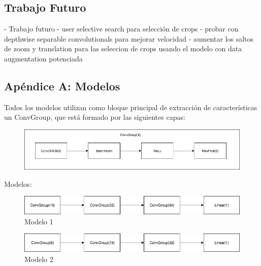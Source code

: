 \documentclass[a4paper, 11pt]{article}
\begin{document}
		\subsection{Trabajo Futuro}
			- Trabajo futuro
				- user selective search para selección de crops
				- probar con depthwise separable convolutionals para mejorar velocidad
				- aumentar los saltos de zoom y translation para las seleccion de crops usando el modelo con data augmentation potenciada
				
	\subsection{Apéndice A: Modelos}
		Todos los modelos utilizan como bloque principal de extracción de características un ConvGroup, que está formado por las siguientes capas:
	
	
	\begin{figure}[htb!]
		\begin{minipage}{1\textwidth}
			\centering
			\includegraphics[scale=.5]{pics/convgroup}
		\end{minipage}\hfill
	\end{figure}
	
		Modelos:
	
	\begin{figure}[htb!]
		\begin{minipage}{1\textwidth}
			\centering
			\includegraphics[scale=.5]{pics/model1}
			\caption{Modelo 1}
		\end{minipage}\hfill
	\end{figure}
	
	
	\begin{figure}[htb!]
		\begin{minipage}{1\textwidth}
			\centering
			\includegraphics[scale=.5]{pics/model2}
			\caption{Modelo 2}
		\end{minipage}\hfill
	\end{figure}
	
\end{document}
